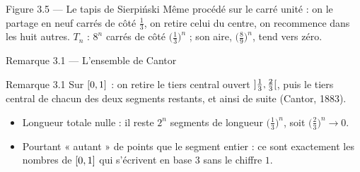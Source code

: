 \begin{frame}{Figure 3.5 --- Le tapis de Sierpiński}
  \small Même procédé sur le carré unité : on le partage en neuf carrés
  de côté $\tfrac13$, on retire celui du centre, on recommence dans les
  huit autres.
  \small $T_n$ : $8^n$ carrés de côté $\big(\tfrac13\big)^n$ ; son aire,
  $\big(\tfrac89\big)^n$, tend vers zéro.
\end{frame}

\begin{frame}{Remarque 3.1 --- L'ensemble de Cantor}
  \begin{Rem}{Remarque 3.1}
    \small Sur $\mathopen{[}{0},{1}\mathclose{]}$ : on retire le tiers central ouvert
    $\mathopen{]}{\tfrac13},{\tfrac23}\mathclose{[}$, puis le tiers central de chacun des deux
    segments restants, et ainsi de suite (Cantor, 1883).
    \FigBox[0.18\textheight]{%
      \begin{tikzpicture}[xscale=8, yscale=0.9]
        
      \end{tikzpicture}}
    \begin{itemize}
      \item Longueur totale nulle : il reste $2^n$ segments de longueur
        $\big(\tfrac13\big)^n$, soit $\big(\tfrac23\big)^n\to0$.
      \item Pourtant « autant » de points que le segment entier : ce sont
        exactement les nombres de $\mathopen{[}{0},{1}\mathclose{]}$ qui s'écrivent en
        base $3$ sans le chiffre $1$.
    \end{itemize}
  \end{Rem}
\end{frame}

